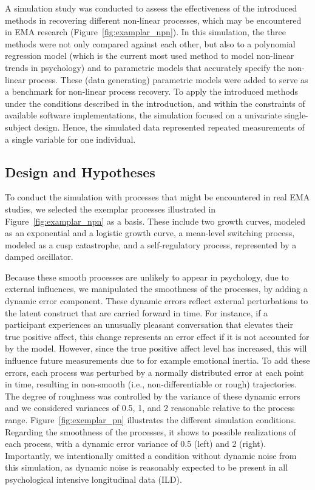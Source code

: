 \documentclass[man, floatsintext]{apa7}
\begin{document}
A simulation study was conducted to assess the effectiveness of the introduced
methods in recovering different non-linear processes, which may be encountered
in EMA research (Figure~\ref{fig:examplar_npn}). In this simulation, the three
methods were not only compared against each other, but also to a polynomial
regression model (which is the current most used method to model non-linear
trends in psychology) and to parametric models that accurately specify the
non-linear process. These (data generating) parametric models were added to
serve as a benchmark for non-linear process recovery. To apply the introduced
methods under the conditions described in the introduction, and within the
constraints of available software implementations, the simulation focused on a
univariate single-subject design. Hence, the simulated data represented
repeated measurements of a single variable for one individual.

\subsection{Design and Hypotheses}

To conduct the simulation with processes that might be encountered in real EMA
studies, we selected the exemplar processes illustrated in
Figure~\ref{fig:examplar_npn} as a basis. These include two growth curves,
modeled as an exponential and a logistic growth curve, a mean-level switching
process, modeled as a cusp catastrophe, and a self-regulatory process,
represented by a damped oscillator.

Because these smooth processes are unlikely to appear in psychology, due
to external influences, we manipulated the smoothness of the processes,
by adding a dynamic error component.
These dynamic errors reflect external perturbations to
the latent construct that are carried forward in time. For instance, if a
participant experiences an unusually pleasant conversation that elevates their
true positive affect, this change represents an error effect if it is not
accounted for by the model. However, since the true positive affect level has
increased, this will influence future measurements due to for example emotional
inertia. To add these errors, each process was perturbed by a normally
distributed error at each point in time, resulting in non-smooth (i.e.,
non-differentiable or rough) trajectories. The degree of roughness was
controlled by the variance of these dynamic errors and we considered variances
of 0.5, 1, and 2 reasonable relative to the process range.
Figure~\ref{fig:exemplar_pn} illustrates the different simulation conditions.
Regarding the smoothness of the processes, it shows to possible realizations
of each process, with a dynamic error variance of 0.5 (left) and 2 (right).
Importantly, we intentionally omitted a
condition without dynamic noise from this simulation, as dynamic noise is
reasonably expected to be present in all psychological intensive longitudinal
data (ILD).
\end{document}
